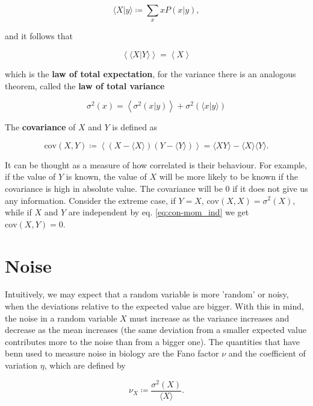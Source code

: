 \begin{equation*}
  \langle X|y\rangle \coloneqq \sum_xxP(x|y),
\end{equation*}

and it follows that

\begin{equation*}
  \left\langle\langle X|Y\rangle\right\rangle = \left\langle X\right\rangle
\end{equation*}

which is the \textbf{law of total expectation}, for the variance there is an analogous theorem, called the \textbf{law of total variance}

\begin{equation*}
  \sigma^2(x) = \left\langle\sigma^2(x|y)\right\rangle + \sigma^2\left(\langle x|y\rangle\right)
\end{equation*}

The \textbf{covariance} of $X$ and $Y$ is defined as

\begin{equation*}
  \text{cov}(X,Y) \coloneqq \left\langle\left(X-\langle X\rangle\right)\left(Y-\langle Y\rangle\right)\right\rangle = \langle XY\rangle - \langle X\rangle\langle Y\rangle.
\end{equation*}

It can be thought as a measure of how correlated is their behaviour. For example, if the value of $Y$ is known, the value of $X$ will be more likely to be known if the covariance is high in absolute value. The covariance will be $0$ if it does not give us any information. Consider the extreme case, if $Y=X$, $\text{cov}(X,X) = \sigma^2(X)$, while if $X$ and $Y$ are independent by eq. \eqref{eq:con-mom_ind} we get $\text{cov}(X,Y) = 0$.

\section{Noise}
\label{sec:con-noise}
Intuitively, we may expect that a random variable is more 'random' or noisy, when the deviations relative to the expected value are bigger. With this in mind, the noise in a random variable $X$ must increase as the variance increases and decrease as the mean increases (the same deviation from a smaller expected value contributes more to the noise than from a bigger one). The quantities that have benn used to measure noise in biology are the Fano factor $\nu$ and the coefficient of variation $\eta$, which are defined by

\begin{equation}
  \label{eq:con-fano_def}
  \nu_X \coloneqq \frac{\sigma^2(X)}{\langle X \rangle}.
\end{equation}

